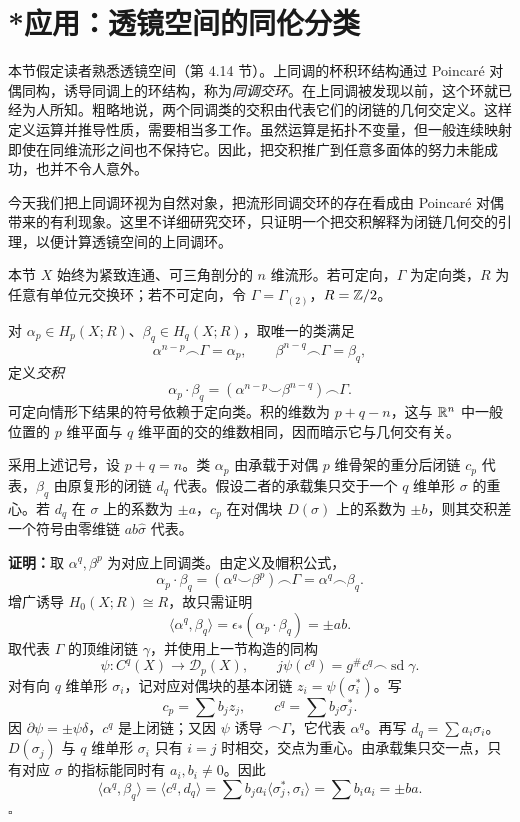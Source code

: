 \section{*应用：透镜空间的同伦分类}
本节假定读者熟悉透镜空间（第 4.14 节）。上同调的杯积环结构通过 Poincaré 对偶同构，诱导同调上的环结构，称为\emph{同调交环}。在上同调被发现以前，这个环就已经为人所知。粗略地说，两个同调类的交积由代表它们的闭链的几何交定义。这样定义运算并推导性质，需要相当多工作。虽然运算是拓扑不变量，但一般连续映射即使在同维流形之间也不保持它。因此，把交积推广到任意多面体的努力未能成功，也并不令人意外。

今天我们把上同调环视为自然对象，把流形同调交环的存在看成由 Poincaré 对偶带来的有利现象。这里不详细研究交环，只证明一个把交积解释为闭链几何交的引理，以便计算透镜空间的上同调环。

本节 $X$ 始终为紧致连通、可三角剖分的 $n$ 维流形。若可定向，$\Gamma$ 为定向类，$R$ 为任意有单位元交换环；若不可定向，令 $\Gamma=\Gamma_{(2)}$，$R=\mathbb{Z}/2$。

对 $\alpha_p\in H_p(X;R)$、$\beta_q\in H_q(X;R)$，取唯一的类满足
\[\alpha^{n-p}\frown\Gamma=\alpha_p,\qquad\beta^{n-q}\frown\Gamma=\beta_q,\]
定义\emph{交积}
\[\alpha_p\cdot\beta_q=(\alpha^{n-p}\smile\beta^{n-q})\frown\Gamma.\]
可定向情形下结果的符号依赖于定向类。积的维数为 $p+q-n$，这与 $\mathbb{R}^n$ 中一般位置的 $p$ 维平面与 $q$ 维平面的交的维数相同，因而暗示它与几何交有关。

采用上述记号，设 $p+q=n$。类 $\alpha_p$ 由承载于对偶 $p$ 维骨架的重分后闭链 $c_p$ 代表，$\beta_q$ 由原复形的闭链 $d_q$ 代表。假设二者的承载集只交于一个 $q$ 维单形 $\sigma$ 的重心。若 $d_q$ 在 $\sigma$ 上的系数为 $\pm a$，$c_p$ 在对偶块 $D(\sigma)$ 上的系数为 $\pm b$，则其交积差一个符号由零维链 $ab\widehat\sigma$ 代表。

\textbf{证明：}取 $\alpha^q,\beta^p$ 为对应上同调类。由定义及帽积公式，
\[\alpha_p\cdot\beta_q=(\alpha^q\smile\beta^p)\frown\Gamma
=\alpha^q\frown\beta_q.\]
增广诱导 $H_0(X;R)\cong R$，故只需证明
\[\langle\alpha^q,\beta_q\rangle=\epsilon_*(\alpha_p\cdot\beta_q)=\pm ab.\]
取代表 $\Gamma$ 的顶维闭链 $\gamma$，并使用上一节构造的同构
\[\psi:C^q(X)\to\mathcal D_p(X),\qquad
j\psi(c^q)=g^\#c^q\frown\operatorname{sd}\gamma.\]
对有向 $q$ 维单形 $\sigma_i$，记对应对偶块的基本闭链 $z_i=\psi(\sigma_i^*)$。写
\[c_p=\sum b_jz_j,\qquad c^q=\sum b_j\sigma_j^*.\]
因 $\partial\psi=\pm\psi\delta$，$c^q$ 是上闭链；又因 $\psi$ 诱导 $\frown\Gamma$，它代表 $\alpha^q$。再写 $d_q=\sum a_i\sigma_i$。$D(\sigma_j)$ 与 $q$ 维单形 $\sigma_i$ 只有 $i=j$ 时相交，交点为重心。由承载集只交一点，只有对应 $\sigma$ 的指标能同时有 $a_i,b_i\ne0$。因此
\[\langle\alpha^q,\beta_q\rangle=\langle c^q,d_q\rangle
=\sum b_ja_i\langle\sigma_j^*,\sigma_i\rangle=\sum b_ia_i=\pm ba.\]
\hfill$\square$

